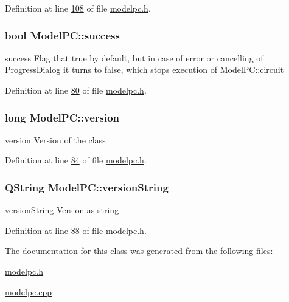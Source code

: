 Definition at line \hyperlink{modelpc_8h_source_l00108}{108} of file \hyperlink{modelpc_8h_source}{modelpc.\+h}.

\subsubsection[{\texorpdfstring{success}{success}}]{\setlength{\rightskip}{0pt plus 5cm}bool Model\+P\+C\+::success}\hypertarget{class_model_p_c_a945ffbbc44a832b953c191debd448f4c}{}\label{class_model_p_c_a945ffbbc44a832b953c191debd448f4c}


success Flag that true by default, but in case of error or cancelling of Progress\+Dialog it turns to false, which stops execution of \hyperlink{class_model_p_c_a1d0091062a0c836b283ec2f67411623b}{Model\+P\+C\+::circuit} 



Definition at line \hyperlink{modelpc_8h_source_l00080}{80} of file \hyperlink{modelpc_8h_source}{modelpc.\+h}.

\subsubsection[{\texorpdfstring{version}{version}}]{\setlength{\rightskip}{0pt plus 5cm}long Model\+P\+C\+::version}\hypertarget{class_model_p_c_a5af48ab89e19be42a94c34ba00249401}{}\label{class_model_p_c_a5af48ab89e19be42a94c34ba00249401}


version Version of the class 



Definition at line \hyperlink{modelpc_8h_source_l00084}{84} of file \hyperlink{modelpc_8h_source}{modelpc.\+h}.

\subsubsection[{\texorpdfstring{version\+String}{versionString}}]{\setlength{\rightskip}{0pt plus 5cm}Q\+String Model\+P\+C\+::version\+String}\hypertarget{class_model_p_c_a5f426725ccf7eefd3c77ea8c720264c9}{}\label{class_model_p_c_a5f426725ccf7eefd3c77ea8c720264c9}


version\+String Version as string 



Definition at line \hyperlink{modelpc_8h_source_l00088}{88} of file \hyperlink{modelpc_8h_source}{modelpc.\+h}.



The documentation for this class was generated from the following files\+:\begin{DoxyCompactItemize}
\item 
\hyperlink{modelpc_8h}{modelpc.\+h}\item 
\hyperlink{modelpc_8cpp}{modelpc.\+cpp}\end{DoxyCompactItemize}
